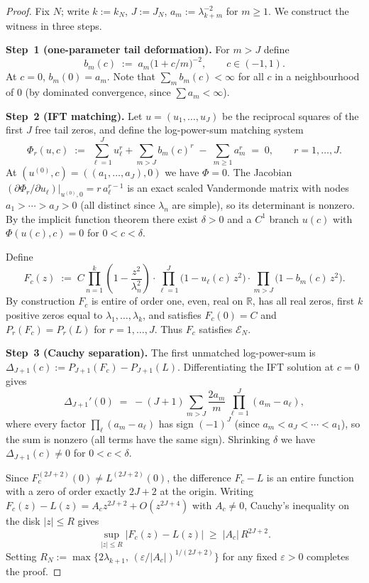 \documentclass[12pt]{amsart}
\theoremstyle{definition}
\theoremstyle{remark}
\theoremstyle{plain}
\newcommand{\RR}{\mathbb{R}}
\begin{document}
\begin{proof}
Fix $N$; write $k:=k_N$, $J:=J_N$, $a_m:=\lambda_{k+m}^{-2}$ for $m\geq 1$.
We construct the witness in three steps.

\medskip
\textbf{Step~1 (one-parameter tail deformation).}
For $m>J$ define
\[
  b_m(c) \;:=\; a_m\bigl(1+c/m\bigr)^{-2},\qquad c\in(-1,1).
\]
At $c=0$, $b_m(0)=a_m$.  Note that $\sum_m b_m(c)<\infty$ for all $c$ in a
neighbourhood of $0$ (by dominated convergence, since $\sum a_m<\infty$).

\medskip
\textbf{Step~2 (IFT matching).}
Let $u=(u_1,\ldots,u_J)$ be the reciprocal squares of the first $J$ free
tail zeros, and define the log-power-sum matching system
\[
  \Phi_r(u,c) \;:=\; \sum_{\ell=1}^{J} u_\ell^r + \sum_{m>J} b_m(c)^r
                \;-\; \sum_{m\geq 1} a_m^r \;=\; 0,\qquad r=1,\ldots,J.
\]
At $(u^{(0)},c)=((a_1,\ldots,a_J),0)$ we have $\Phi=0$.  The Jacobian
$(\partial\Phi_r/\partial u_\ell)|_{u^{(0)},0} = r\,a_\ell^{r-1}$ is an
exact scaled Vandermonde matrix with nodes $a_1>\cdots>a_J>0$ (all distinct
since $\lambda_n$ are simple), so its determinant is nonzero.  By the implicit
function theorem there exist $\delta>0$ and a $C^1$ branch $u(c)$ with
$\Phi(u(c),c)=0$ for $0<c<\delta$.

Define
\[
  F_c(z) \;:=\; C\prod_{n=1}^{k}\!\left(1-\frac{z^2}{\lambda_n^2}\right)
               \cdot\prod_{\ell=1}^{J}\!\bigl(1-u_\ell(c)\,z^2\bigr)
               \cdot\prod_{m>J}\!\bigl(1-b_m(c)\,z^2\bigr).
\]
By construction $F_c$ is entire of order one, even, real on $\RR$, has all
real zeros, first $k$ positive zeros equal to $\lambda_1,\ldots,\lambda_k$,
and satisfies $F_c(0)=C$ and $P_r(F_c)=P_r(L)$ for $r=1,\ldots,J$.  Thus
$F_c$ satisfies $\mathcal{E}_N$.

\medskip
\textbf{Step~3 (Cauchy separation).}
The first unmatched log-power-sum is
$\Delta_{J+1}(c):=P_{J+1}(F_c)-P_{J+1}(L)$.  Differentiating the IFT
solution at $c=0$ gives
\[
  \Delta_{J+1}'(0) \;=\;
  -(J+1)\sum_{m>J} \frac{2a_m}{m}\,\prod_{\ell=1}^{J}(a_m-a_\ell),
\]
where every factor $\prod_{\ell}(a_m-a_\ell)$ has sign $(-1)^J$ (since
$a_m<a_J<\cdots<a_1$), so the sum is nonzero (all terms have the same sign).
Shrinking $\delta$ we have $\Delta_{J+1}(c)\neq 0$ for $0<c<\delta$.

Since $F_c^{(2J+2)}(0)\neq L^{(2J+2)}(0)$, the difference $F_c-L$ is an
entire function with a zero of order exactly $2J+2$ at the origin.  Writing
$F_c(z)-L(z)=A_c z^{2J+2}+O(z^{2J+4})$ with $A_c\neq 0$, Cauchy's
inequality on the disk $|z|\leq R$ gives
\[
  \sup_{|z|\leq R}\lvert F_c(z)-L(z)\rvert \;\geq\; |A_c|\,R^{2J+2}.
\]
Setting $R_N:=\max\{2\lambda_{k+1},\,(\varepsilon/|A_c|)^{1/(2J+2)}\}$ for any
fixed $\varepsilon>0$ completes the proof.
\end{proof}
\end{document}
